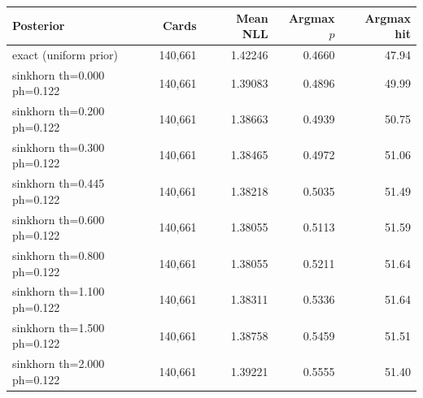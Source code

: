 \begin{tabular}{lrrrr}
\toprule
Posterior & Cards & Mean NLL & Argmax $p$ & Argmax hit \\
\midrule
exact (uniform prior) & 140,661 & 1.42246 & 0.4660 & 47.94 \\
sinkhorn th=0.000 ph=0.122 & 140,661 & 1.39083 & 0.4896 & 49.99 \\
sinkhorn th=0.200 ph=0.122 & 140,661 & 1.38663 & 0.4939 & 50.75 \\
sinkhorn th=0.300 ph=0.122 & 140,661 & 1.38465 & 0.4972 & 51.06 \\
sinkhorn th=0.445 ph=0.122 & 140,661 & 1.38218 & 0.5035 & 51.49 \\
sinkhorn th=0.600 ph=0.122 & 140,661 & 1.38055 & 0.5113 & 51.59 \\
sinkhorn th=0.800 ph=0.122 & 140,661 & 1.38055 & 0.5211 & 51.64 \\
sinkhorn th=1.100 ph=0.122 & 140,661 & 1.38311 & 0.5336 & 51.64 \\
sinkhorn th=1.500 ph=0.122 & 140,661 & 1.38758 & 0.5459 & 51.51 \\
sinkhorn th=2.000 ph=0.122 & 140,661 & 1.39221 & 0.5555 & 51.40 \\
\bottomrule
\end{tabular}
